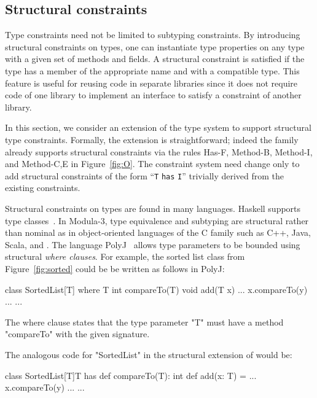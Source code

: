 \subsection{Structural constraints}
\label{sec:structural}

Type constraints need not be limited to subtyping constraints.
By introducing structural constraints on types, one can
instantiate
type properties on any type with a given set
of methods and fields.
A structural constraint is satisfied if the type has a member of
the appropriate name and with a compatible type.
This feature is useful for reusing code
in separate libraries since it does not require
code of one library to implement an interface to satisfy a
constraint of another library.

In this section, we consider an extension of the \Xten{} type system
to support structural type constraints.  Formally, the extension
is straightforward; indeed the \FX{} family already supports structural constraints
via the rules {\sc Has-F},
{\sc Method-B},
{\sc Method-I},
and
{\sc Method-C,E} in Figure~\ref{fig:O}.
The constraint system need change only to add 
structural
constraints of the form ``{\tt T} {\tt has} {\tt I}''
trivially derived from the existing constraints.

Structural constraints on types are found in many languages.
Haskell supports type
classes~\cite{haskell,haskell-type-classes}.
In Modula-3, type equivalence and subtyping are structural
rather than nominal as in object-oriented languages of the C
family such as C++, Java, Scala, and \Xten{}.
%
The language PolyJ~\cite{java-popl97} allows type parameters to be
bounded using
structural \emph{where clauses}.
For example, the sorted list class from Figure~\ref{fig:sorted}
could be
be written as follows in PolyJ:
\begin{xten}
class SortedList[T] where T {int compareTo(T)} {
    void add(T x) { ... x.compareTo(y) ... }
    ...
}
\end{xten}
The where clause states that the type parameter \xcd"T" must have a
method \xcd"compareTo" with the given signature.

The analogous code for \xcd"SortedList" in the structural
extension of \Xten{} would be:
\begin{xten}
class SortedList[T]{T has def compareTo(T): int} {
    def add(x: T) = { ... x.compareTo(y) ... }
    ...
}
\end{xten}

